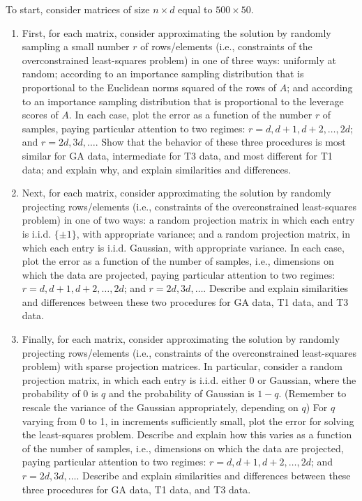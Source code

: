 \begin{enumerate}
    To start, consider matrices of size $n\times d$ equal to $500 \times 50$.
    \begin{enumerate}
        \item First, for each matrix, consider approximating the solution by randomly sampling a small number $r$ of rows/elements (i.e., constraints of the overconstrained least-squares problem) in one of three ways: uniformly at random; according to an importance sampling distribution that is proportional to the Euclidean norms squared of the rows of $A$; and according to an importance sampling distribution that is proportional to the leverage scores of $A$. In each case, plot the error as a function of the number $r$ of samples, paying particular attention to two regimes: $r=d,d+1,d+2, \ldots,2d$; and $r=2d,3d, \ldots$. Show that the behavior of these three procedures is most similar for GA data, intermediate for T3 data, and most different for T1 data; and explain why, and explain similarities and differences.
        
        \item Next, for each matrix, consider approximating the solution by randomly projecting rows/elements (i.e., constraints of the overconstrained least-squares problem) in one of two ways: a random projection matrix in which each entry is i.i.d. $\{\pm1\}$, with appropriate variance; and a random projection matrix, in which each entry is i.i.d. Gaussian, with appropriate variance. In each case, plot the error as a function of the number of samples, i.e., dimensions on which the data are projected, paying particular attention to two regimes: $r=d,d+1,d+2, \ldots,2d$; and $r=2d,3d, \ldots$. Describe and explain similarities and differences between these two procedures for GA data, T1 data, and T3 data.
        \item Finally, for each matrix, consider approximating the solution by randomly projecting rows/elements (i.e., constraints of the overconstrained least-squares problem) with sparse projection matrices. In particular, consider a random projection matrix, in which each entry is i.i.d. either 0 or Gaussian, where the probability of 0 is $q$ and the probability of Gaussian is $1-q$. (Remember to rescale the variance of the Gaussian appropriately, depending on $q$) For $q$ varying from 0 to 1, in increments sufficiently small, plot the error for  solving the least-squares problem. Describe and explain how this varies as a function of the number of samples, i.e., dimensions on which the data are projected, paying particular attention to two regimes: $r=d,d+1,d+2, \ldots,2d$; and $r=2d,3d, \ldots$. Describe and explain similarities and differences between these three procedures for GA data, T1 data, and T3 data.\\
        

\end{enumerate}
\end{enumerate}
